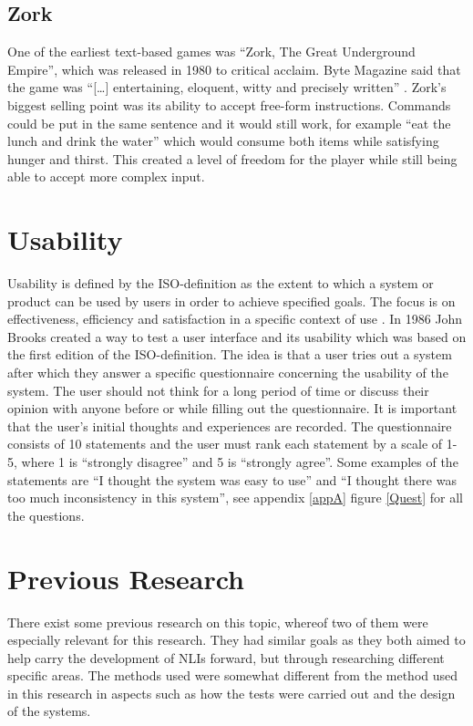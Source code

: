 \subsection{Zork} \label{sec:zork}
One of the earliest text-based games was ``Zork, The Great Underground Empire'', which was released in 1980 to critical acclaim. Byte Magazine said that the game was ``[\ldots] entertaining, eloquent, witty and precisely written''  \citep[page 264]{Byte}. Zork's biggest selling point was its ability to accept free-form instructions. Commands could be put in the same sentence and it would still work, for example ``eat the lunch and drink the water'' which would consume both items while satisfying hunger and thirst. This created a level of freedom for the player while still being able to accept more complex input. \citep{Byte}

\section{Usability} \label{usability}
Usability is defined by the ISO-definition as the extent to which a system or product can be used by users in order to achieve specified goals. The focus is on effectiveness, efficiency and satisfaction in a specific context of use \citep{ISO}. In 1986 John Brooks created a way to test a user interface and its usability which was based on the first edition of the ISO-definition. The idea is that a user tries out a system after which they answer a specific questionnaire concerning the usability of the system. The user should not think for a long period of time or discuss their opinion with anyone before or while filling out the questionnaire. It is important that the user’s initial thoughts and experiences are recorded. The questionnaire consists of 10 statements and the user must rank each statement by a scale of 1-5, where 1 is “strongly disagree” and 5 is “strongly agree”. Some examples of the statements are “I thought the system was easy to use” and “I thought there was too much inconsistency in this system”, see appendix \ref{appA} figure \ref{Quest} for all the questions. \citep{Broo}

\section{Previous Research}
There exist some previous research on this topic, whereof two of them were especially relevant for this research. They had similar goals as they both aimed to help carry the development of NLIs forward, but through researching different specific areas. The methods used were somewhat different from the method used in this research in aspects such as how the tests were carried out and the design of the systems.


